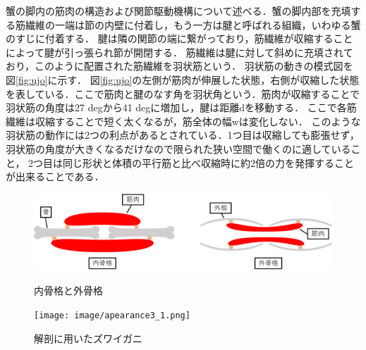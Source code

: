 蟹の脚内の筋肉の構造および関節駆動機構について述べる．蟹の脚内部を充填する筋繊維の一端は節の内壁に付着し，もう一方は腱と呼ばれる組織，いわゆる蟹のすじに付着する．
腱は隣の関節の端に繋がっており，筋繊維が収縮することによって腱が引っ張られ節が開閉する．
筋繊維は腱に対して斜めに充填されており，このように配置された筋繊維を羽状筋という．
羽状筋の動きの模式図を図\ref{fig:ujo}に示す．
図\ref{fig:ujo}の左側が筋肉が伸展した状態，右側が収縮した状態を表している．ここで筋肉と腱のなす角を羽状角という．筋肉が収縮することで羽状筋の角度は27 degから41 degに増加し，腱は距離dを移動する．
ここで各筋繊維は収縮することで短く太くなるが，筋全体の幅wは変化しない．
このような羽状筋の動作には2つの利点があるとされている．1つ目は収縮しても膨張せず，羽状筋の角度が大きくなるだけなので限られた狭い空間で働くのに適していること，
2つ目は同じ形状と体積の平行筋と比べ収縮時に約2倍の力を発揮することが出来ることである\cite{warner1977biology}．
\begin{figure}[ht]
  \begin{minipage}{0.49\hsize}
    \vspace{10mm}
    \centering
    \includegraphics[scale=0.058]{image/kokkaku.png}
    \vspace{5mm}
    \caption{内骨格と外骨格\cite{hasegawa}}
    \label{fig:naigai}
  \end{minipage}
  \begin{minipage}{0.49\hsize}
    \centering
    \texttt{[image: image/apearance3\_1.png]}
    \caption{解剖に用いたズワイガニ\cite{hasegawa}}
    \label{fig:zuwai}
  \end{minipage}
\end{figure}
